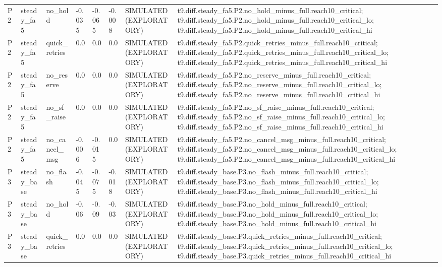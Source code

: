 \begin{table}[t]
\begin{tabular}{llllllll}
P2 & steady\_fa5 & no\_hold & -0.035 & -0.065 & -0.008 & SIMULATED (EXPLORATORY) & t9.diff.steady\_fa5.P2.no\_hold\_minus\_full.reach10\_critical; t9.diff.steady\_fa5.P2.no\_hold\_minus\_full.reach10\_critical\_lo; t9.diff.steady\_fa5.P2.no\_hold\_minus\_full.reach10\_critical\_hi \\
P2 & steady\_fa5 & quick\_retries & 0.0 & 0.0 & 0.0 & SIMULATED (EXPLORATORY) & t9.diff.steady\_fa5.P2.quick\_retries\_minus\_full.reach10\_critical; t9.diff.steady\_fa5.P2.quick\_retries\_minus\_full.reach10\_critical\_lo; t9.diff.steady\_fa5.P2.quick\_retries\_minus\_full.reach10\_critical\_hi \\
P2 & steady\_fa5 & no\_reserve & 0.0 & 0.0 & 0.0 & SIMULATED (EXPLORATORY) & t9.diff.steady\_fa5.P2.no\_reserve\_minus\_full.reach10\_critical; t9.diff.steady\_fa5.P2.no\_reserve\_minus\_full.reach10\_critical\_lo; t9.diff.steady\_fa5.P2.no\_reserve\_minus\_full.reach10\_critical\_hi \\
P2 & steady\_fa5 & no\_sf\_raise & 0.0 & 0.0 & 0.0 & SIMULATED (EXPLORATORY) & t9.diff.steady\_fa5.P2.no\_sf\_raise\_minus\_full.reach10\_critical; t9.diff.steady\_fa5.P2.no\_sf\_raise\_minus\_full.reach10\_critical\_lo; t9.diff.steady\_fa5.P2.no\_sf\_raise\_minus\_full.reach10\_critical\_hi \\
P2 & steady\_fa5 & no\_cancel\_msg & -0.006 & -0.015 & 0.0 & SIMULATED (EXPLORATORY) & t9.diff.steady\_fa5.P2.no\_cancel\_msg\_minus\_full.reach10\_critical; t9.diff.steady\_fa5.P2.no\_cancel\_msg\_minus\_full.reach10\_critical\_lo; t9.diff.steady\_fa5.P2.no\_cancel\_msg\_minus\_full.reach10\_critical\_hi \\
P3 & steady\_base & no\_flash & -0.045 & -0.075 & -0.018 & SIMULATED (EXPLORATORY) & t9.diff.steady\_base.P3.no\_flash\_minus\_full.reach10\_critical; t9.diff.steady\_base.P3.no\_flash\_minus\_full.reach10\_critical\_lo; t9.diff.steady\_base.P3.no\_flash\_minus\_full.reach10\_critical\_hi \\
P3 & steady\_base & no\_hold & -0.06 & -0.09 & -0.03 & SIMULATED (EXPLORATORY) & t9.diff.steady\_base.P3.no\_hold\_minus\_full.reach10\_critical; t9.diff.steady\_base.P3.no\_hold\_minus\_full.reach10\_critical\_lo; t9.diff.steady\_base.P3.no\_hold\_minus\_full.reach10\_critical\_hi \\
P3 & steady\_base & quick\_retries & 0.0 & 0.0 & 0.0 & SIMULATED (EXPLORATORY) & t9.diff.steady\_base.P3.quick\_retries\_minus\_full.reach10\_critical; t9.diff.steady\_base.P3.quick\_retries\_minus\_full.reach10\_critical\_lo; t9.diff.steady\_base.P3.quick\_retries\_minus\_full.reach10\_critical\_hi \\

\end{tabular}
\end{table}
